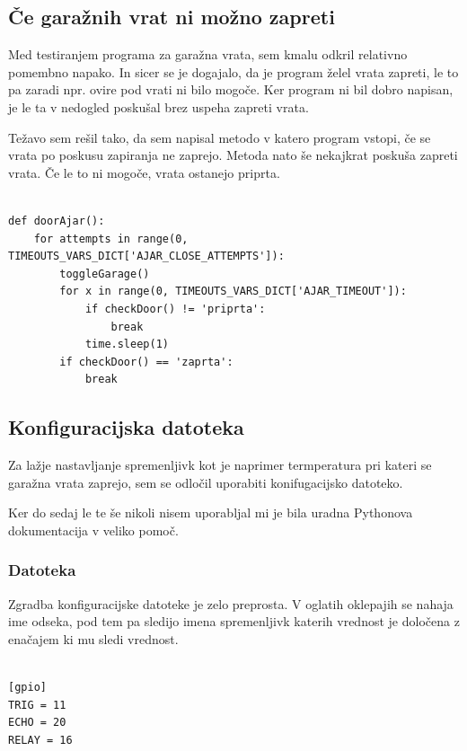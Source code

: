 \documentclass[11pt]{article}
\begin{document}
\subsection{Če garažnih vrat ni možno zapreti}
Med testiranjem programa za garažna vrata, sem kmalu odkril relativno pomembno napako. In sicer se je dogajalo, da je program želel vrata zapreti, le to pa zaradi npr. ovire pod vrati ni bilo mogoče. Ker program ni bil dobro napisan, je le ta v nedogled poskušal brez uspeha zapreti vrata.

Težavo sem rešil tako, da sem napisal metodo v katero program vstopi, če se vrata po poskusu zapiranja ne zaprejo. Metoda nato še nekajkrat poskuša zapreti vrata. Če le to ni mogoče, vrata ostanejo priprta.

\begin{verbatim}

def doorAjar():
    for attempts in range(0, TIMEOUTS_VARS_DICT['AJAR_CLOSE_ATTEMPTS']):
        toggleGarage()
        for x in range(0, TIMEOUTS_VARS_DICT['AJAR_TIMEOUT']):
            if checkDoor() != 'priprta':
                break
            time.sleep(1)
        if checkDoor() == 'zaprta':
            break
\end{verbatim}

\subsection{Konfiguracijska datoteka}
Za lažje nastavljanje spremenljivk kot je naprimer termperatura pri kateri se garažna vrata zaprejo, sem se odločil uporabiti konifugacijsko datoteko.

Ker do sedaj le te še nikoli nisem uporabljal mi je bila uradna Pythonova dokumentacija\cite{Py_configParser} v veliko pomoč.
\newpage
\subsubsection{Datoteka}
Zgradba konfiguracijske datoteke je zelo preprosta. V oglatih oklepajih se nahaja ime odseka, pod tem pa sledijo imena spremenljivk katerih vrednost je določena z enačajem ki mu sledi vrednost.
\begin{verbatim}

[gpio]
TRIG = 11
ECHO = 20
RELAY = 16
\end{verbatim}
\end{document}
